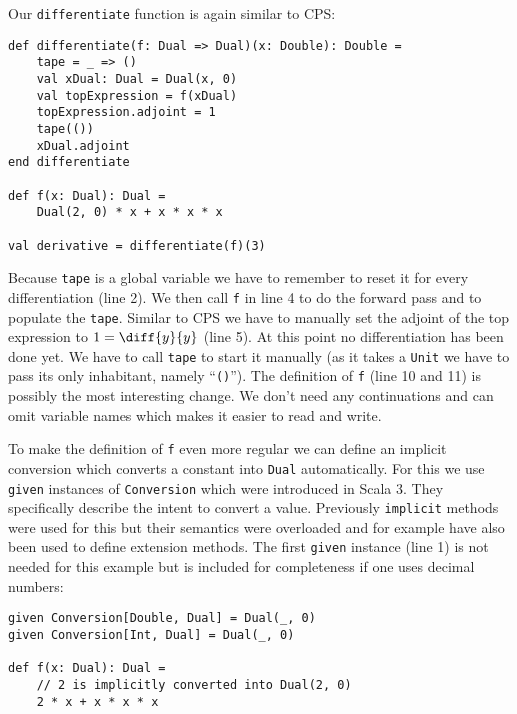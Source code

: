 Our \lstinline{differentiate} function is again similar to CPS:
\begin{lstlisting}
def differentiate(f: Dual => Dual)(x: Double): Double =
    tape = _ => ()
    val xDual: Dual = Dual(x, 0)
    val topExpression = f(xDual)
    topExpression.adjoint = 1
    tape(())
    xDual.adjoint
end differentiate

def f(x: Dual): Dual =
    Dual(2, 0) * x + x * x * x

val derivative = differentiate(f)(3)
\end{lstlisting}
Because \lstinline{tape} is a global variable we have to remember to reset it for every differentiation (line 2). We then call \lstinline{f} in line 4 to do the forward pass and to populate the \lstinline{tape}. Similar to CPS we have to manually set the adjoint of the top expression to $1 = \diff{y}{y}$ (line 5). At this point no differentiation has been done yet. We have to call \lstinline{tape} to start it manually (as it takes a \lstinline{Unit} we have to pass its only inhabitant, namely ``\lstinline{()}''). The definition of \lstinline{f} (line 10 and 11) is possibly the most interesting change. We don't need any continuations and can omit variable names which makes it easier to read and write. 

To make the definition of \lstinline{f} even more regular we can define an implicit conversion which converts a constant into \lstinline{Dual} automatically. For this we use \lstinline{given} instances \cite{givensScala3} of \lstinline{Conversion} \cite{conversionsScala3} which were introduced in Scala 3. They specifically describe the intent to convert a value. Previously \lstinline{implicit} methods were used for this but their semantics were overloaded and for example have also been used to define extension methods. The first \lstinline{given} instance (line 1) is not needed for this example but is included for completeness if one uses decimal numbers:
\begin{lstlisting}
given Conversion[Double, Dual] = Dual(_, 0)
given Conversion[Int, Dual] = Dual(_, 0)

def f(x: Dual): Dual =
    // 2 is implicitly converted into Dual(2, 0)
    2 * x + x * x * x
\end{lstlisting}

